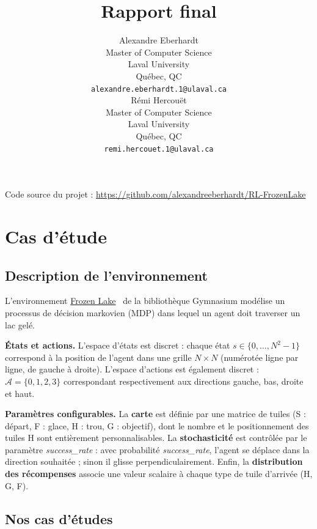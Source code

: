 \documentclass{article}
\title{Rapport final}
\author{\hspace{1mm}Alexandre Eberhardt\\
	Master of Computer Science\\
	Laval University\\
	Québec, QC \\
	\texttt{alexandre.eberhardt.1@ulaval.ca} \\
	\And
    \hspace{1mm}Rémi Hercouët \\
	Master of Computer Science\\
	  Laval University\\
	Québec, QC \\
	\texttt{remi.hercouet.1@ulaval.ca} \\
}
\begin{document}
\maketitle
\vspace{-0.5cm}

\begin{center}
    Code source du projet : \url{https://github.com/alexandreeberhardt/RL-FrozenLake}
\end{center}

\section{Cas d'étude}

\subsection{Description de l'environnement}

L'environnement \href{https://gymnasium.farama.org/environments/toy_text/frozen_lake/}{Frozen Lake}~\citep{towers2024gymnasium} de la bibliothèque Gymnasium modélise un processus de décision markovien (MDP) dans lequel un agent doit traverser un lac gelé.

\textbf{États et actions.} L'espace d'états est discret : chaque état $s \in \{0, \ldots, N^2{-}1\}$ correspond à la position de l'agent dans une grille $N \times N$ (numérotée ligne par ligne, de gauche à droite). L'espace d'actions est également discret : $\mathcal{A} = \{0, 1, 2, 3\}$ correspondant respectivement aux directions gauche, bas, droite et haut.

\textbf{Paramètres configurables.} La \textbf{carte} est définie par une matrice de tuiles (S : départ, F : glace, H : trou, G : objectif), dont le nombre et le positionnement des tuiles H sont entièrement personnalisables. La \textbf{stochasticité} est contrôlée par le paramètre \textit{success\_rate} : avec probabilité \textit{success\_rate}, l'agent se déplace dans la direction souhaitée ; sinon il glisse perpendiculairement. Enfin, la \textbf{distribution des récompenses} associe une valeur scalaire à chaque type de tuile d'arrivée (H, G, F).

\subsection{Nos cas d'études}
\end{document}
